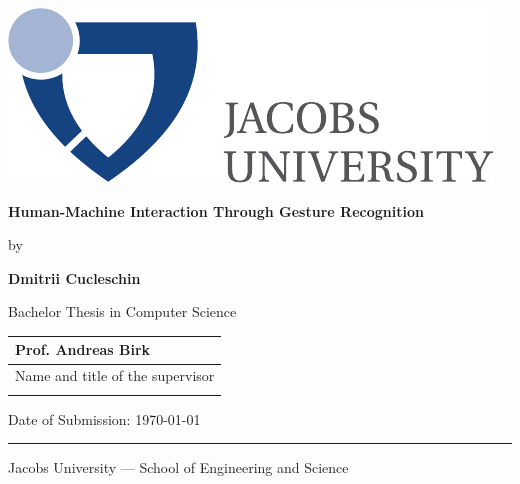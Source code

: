 \documentclass[a4paper,11pt,oneside]{article}
\newcommand{\myname}{Dmitrii Cucleschin}
\newcommand{\mytitle}{Human-Machine Interaction Through Gesture Recognition}
\newcommand{\mysupervisor}{Prof. Andreas Birk}
\begin{document}

  \thispagestyle{empty}

  \begin{flushright}
    \includegraphics[scale=0.7]{bsc-logo}
  \end{flushright}
  \vspace{20mm}
  \begin{center}
    \huge
    \textbf{\mytitle}
  \end{center}
  \vspace*{4mm}
  \begin{center}
   \Large by
  \end{center}
  \vspace*{4mm}
  \begin{center}
    \Large
    \textbf{\myname}
  \end{center}
  \vspace*{20mm}
  \begin{center}
    \large
    Bachelor Thesis in Computer Science
  \end{center}
  \vfill
  \begin{flushright}
    \large
    \begin{tabular}{l}
      \mysupervisor \\
      \hline
      Name and title of the supervisor \\
      \\
    \end{tabular}
  \end{flushright}
  \vspace*{8mm}
  \begin{flushleft}
    \large
    Date of Submission: \today \\
    \rule{\textwidth}{1pt}
  \end{flushleft}
  \begin{center}
    \Large Jacobs University --- School of Engineering and Science
  \end{center}

  \newpage
  \thispagestyle{empty}
\end{document}
